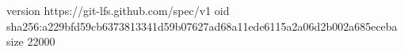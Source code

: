 version https://git-lfs.github.com/spec/v1
oid sha256:a229bfd59cb6373813341d59b07627ad68a11ede6115a2a06d2b002a685eceba
size 22000
